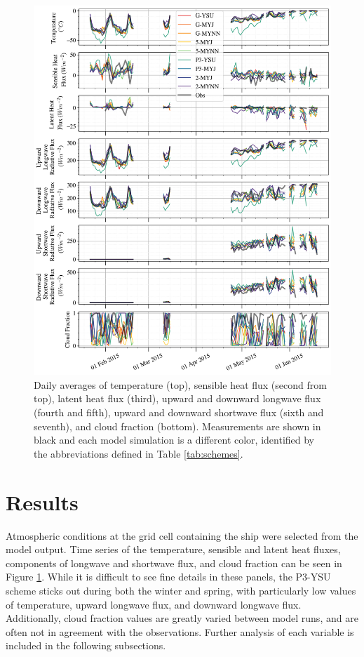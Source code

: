\begin{figure}[p!]
    \centering
        \vspace*{-1cm}
    \includegraphics[width=1\linewidth]{figures/chapter3/WRF_totaltimeseries.png}
    \caption[Polar WRF simulated temperature, pressure, sensible and latent heat flux, components of longwave and shortwave flux, and cloud fraction time series.]{Daily averages of temperature (top), sensible heat flux (second from top), latent heat flux (third), upward and downward longwave flux (fourth and fifth), upward and downward shortwave flux (sixth and seventh), and cloud fraction (bottom). Measurements are shown in black and each model simulation is a different color, identified by the abbreviations defined in Table \ref{tab:schemes}.}
    \label{fig:wrf_all}
\end{figure}

\section{Results}
Atmospheric conditions at the grid cell containing the ship were selected from the model output. Time series of the temperature, sensible and latent heat fluxes, components of longwave and shortwave flux, and cloud fraction can be seen in Figure \ref{fig:wrf_all}. While it is difficult to see fine details in these panels, the P3-YSU scheme sticks out during both the winter and spring, with particularly low values of temperature, upward longwave flux, and downward longwave flux. Additionally, cloud fraction values are greatly varied between model runs, and are often not in agreement with the observations. Further analysis of each variable is included in the following subsections.

